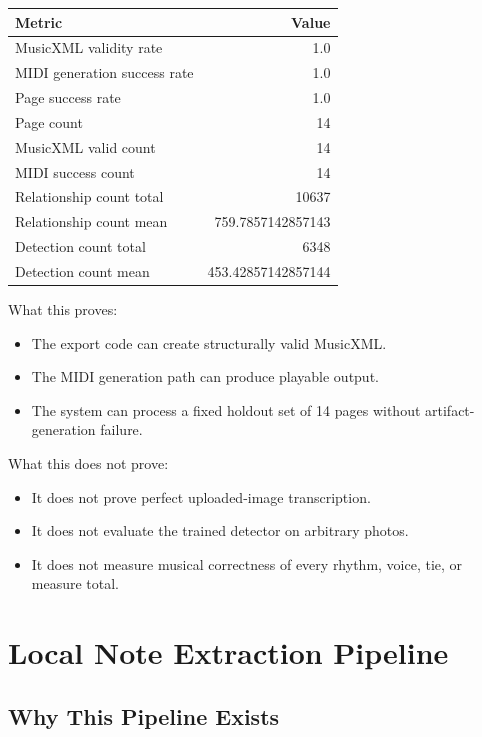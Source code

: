 \documentclass[11pt]{article}
\begin{document}
\begin{center}
\begin{tabular}{lr}
\toprule
\textbf{Metric} & \textbf{Value}\\
\midrule
MusicXML validity rate & 1.0\\
MIDI generation success rate & 1.0\\
Page success rate & 1.0\\
Page count & 14\\
MusicXML valid count & 14\\
MIDI success count & 14\\
Relationship count total & 10637\\
Relationship count mean & 759.7857142857143\\
Detection count total & 6348\\
Detection count mean & 453.42857142857144\\
\bottomrule
\end{tabular}
\end{center}

What this proves:

\begin{itemize}
  \item The export code can create structurally valid MusicXML.
  \item The MIDI generation path can produce playable output.
  \item The system can process a fixed holdout set of 14 pages without artifact-generation failure.
\end{itemize}

What this does not prove:

\begin{itemize}
  \item It does not prove perfect uploaded-image transcription.
  \item It does not evaluate the trained detector on arbitrary photos.
  \item It does not measure musical correctness of every rhythm, voice, tie, or measure total.
\end{itemize}

\section{Local Note Extraction Pipeline}

\subsection{Why This Pipeline Exists}
\end{document}
